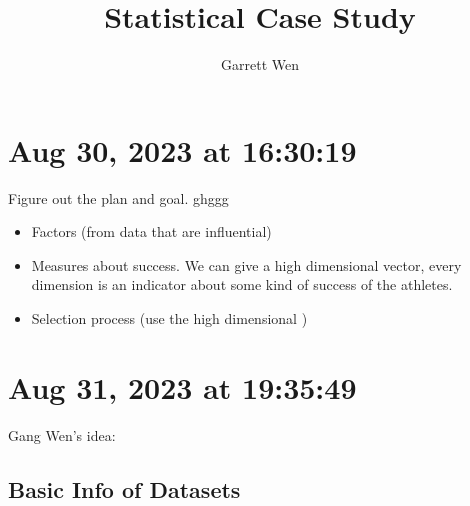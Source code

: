 \documentclass[11pt]{article}
\title{Statistical Case Study}
\author{Garrett Wen}
\begin{document}
\maketitle
\tableofcontents
\section{Aug 30, 2023 at 16:30:19}

Figure out the plan and goal. 
ghggg

\begin{itemize}
	\item Factors (from data that are influential)
	\item Measures about success.
	We can give a high dimensional vector, every dimension is an indicator about some kind of success of the athletes. 
	\item Selection process (use the high dimensional )
\end{itemize}
\section{Aug 31, 2023 at 19:35:49}
Gang Wen's idea:

\subsection{Basic Info of Datasets}
\end{document}
